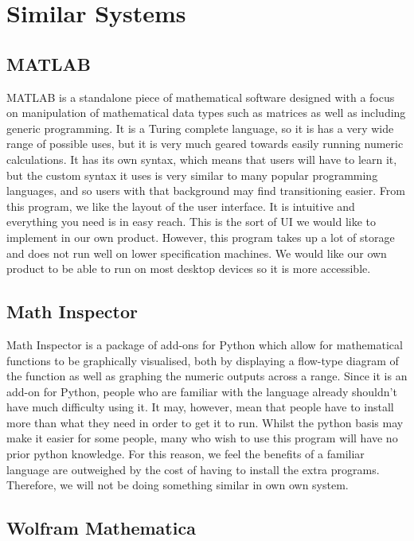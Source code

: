 \documentclass[a4paper, oneside, 11pt]{report}
\begin{document}
\section{Similar Systems}

\subsection{MATLAB\cite{MATLAB}}

MATLAB is a standalone piece of mathematical software designed with a focus on manipulation of mathematical data types such as matrices as well as including generic programming. 
It is a Turing complete language, so it is has a very wide range of possible uses, but it is very much geared towards easily running numeric calculations. It has its own syntax,
which means that users will have to learn it, but the custom syntax it uses is very similar to many popular programming languages, and so users with that background may find transitioning easier.
From this program, we like the layout of the user interface. It is intuitive and everything you need is in easy reach. This is the sort of UI we would like to implement in our own product.
However, this program takes up a lot of storage and does not run well on lower specification machines. We would like our own product to be able to run on most desktop devices so it is more accessible.

\subsection{Math Inspector\cite{Math_Inspector}}

Math Inspector is a package of add-ons for Python which allow for mathematical functions to be graphically visualised, both by displaying a flow-type diagram of the function as well as graphing the numeric outputs across a range.
 Since it is an add-on for Python, people who are familiar with the language already shouldn't have much difficulty using it. It may, however, mean that people have to install more than what they need in order to get it to run.
Whilst the python basis may make it easier for some people, many who wish to use this program will have no prior python knowledge. For this reason, we feel the benefits of a familiar language are outweighed by the cost of having to install the extra programs. Therefore, we will not be doing something similar in own own system.

\subsection{Wolfram Mathematica\cite{Mathematica}}
\end{document}

